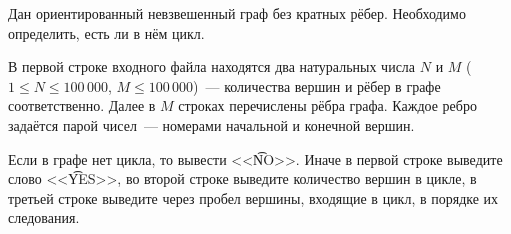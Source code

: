 Дан ориентированный невзвешенный граф без кратных рёбер.
Необходимо определить, есть ли в нём цикл.

\InputFile
В первой строке входного файла находятся два натуральных числа $N$ и $M$ 
($1 \leqslant N \leqslant 100\,000$, $M \leqslant 100\,000$)~---
количества вершин и рёбер в графе соответственно. Далее в $M$ строках
перечислены рёбра графа. Каждое ребро  задаётся парой чисел~---
номерами начальной и конечной вершин.

\OutputFile
Если в графе нет цикла, то вывести <<\t{NO}>>.
Иначе в первой строке выведите слово <<\t{YES}>>,
во второй строке выведите количество вершин в цикле,
в третьей строке выведите через пробел вершины, входящие
в цикл, в порядке их следования.

